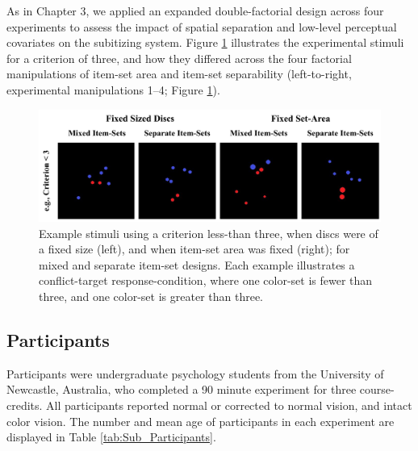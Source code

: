 As in Chapter 3, we applied an expanded double-factorial design across four experiments to assess the impact of spatial separation and low-level perceptual covariates on the subitizing system. Figure \ref{fig:subStim} illustrates the experimental stimuli for a criterion of three, and how they differed across the four factorial manipulations of item-set area and item-set separability (left-to-right, experimental manipulations 1--4; Figure \ref{fig:subStim}).



\begin{figure}[hbt]
\centering \includegraphics[width=\linewidth]{Figures/Subitizing/SubStim.jpg}
\caption{Example stimuli using a criterion less-than three, when discs were of a fixed size (left), and when item-set area was fixed (right); for mixed and separate item-set designs. Each example illustrates a conflict-target response-condition, where one color-set is fewer than three, and one color-set is greater than three.}
\label{fig:subStim}
\end{figure}


\subsection{Participants}
Participants were undergraduate psychology students from the University of Newcastle, Australia, who completed a 90 minute experiment for three course-credits. All participants reported  normal or corrected to normal vision, and intact color vision. The number and mean age of participants in each experiment are displayed in Table \ref{tab:Sub_Participants}.


